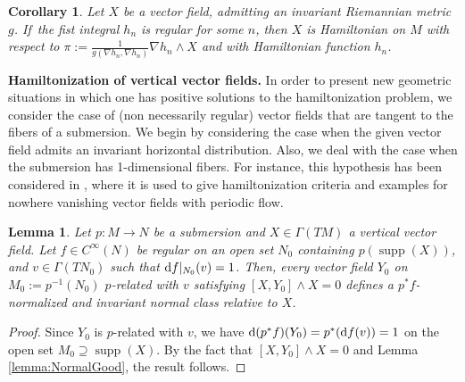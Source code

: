 \documentclass[10pt,a4paper]{amsart}
\newcommand{\dd}{{\rm d}}
\numberwithin{equation}{section}
\newtheorem{Corollary}[Theorem]{Corollary}
\newtheorem{Lemma}[Theorem]{Lemma}
\begin{document}
\begin{Corollary}%
Let $X$ be a vector field, admitting an invariant Riemannian metric $g$. If~the fist integral $h_n$ is regular for some $n$, then $X$ is Hamiltonian on $M$ with respect to $\pi:=\frac{1}{g(\nabla h_{n},\nabla h_{n})}\nabla h_{n}\wedge X$ and with Hamiltonian function $h_{n}$.
\end{Corollary}

{\bf Hamiltonization of vertical vector fields.} In order to present new geometric situations in which one has positive solutions to the hamiltonization problem, we consider the case of (non necessarily regular) vector fields that are tangent to the fibers of a submersion. We begin by considering the case when the given vector field admits an invariant horizontal distribution. Also, we deal with the case when the submersion has 1-dimensional fibers. For instance, this hypothesis has been considered in \cite{FGS-05}, where it is used to give hamiltonization criteria and examples for nowhere vanishing vector fields with periodic flow.

\begin{Lemma}\label{lemma:NormalProy}
Let $p\colon M \to N$ be a submersion and $X \in \Gamma(TM)$ a vertical vector field. Let $f \in C^{\infty}(N)$ be regular on an open set $N_0$ containing $p(\operatorname{supp}(X))$, and $v \in \Gamma(TN_0)$ such that $\dd{f}|_{N_0}(v) = 1$. Then, every vector field $Y_0$ on $M_0:=p^{-1}(N_0)$ $p$-related with $v$ satisfying $[X,Y_0]\wedge X=0$ defines a $p^{*}f$-normalized and invariant normal class relative to $X$.
\end{Lemma}
\begin{proof}
Since $Y_0$ is $p$-related with $v$, we have $\dd (p^{*}f)(Y_0) = p^{*}(\dd f(v))=1$ on the open set $M_0 \supseteq \operatorname{supp}(X)$. By the fact that $[X,Y_0] \wedge X=0$ and Lemma \ref{lemma:NormalGood}, the result follows.
\end{proof}
\end{document}
